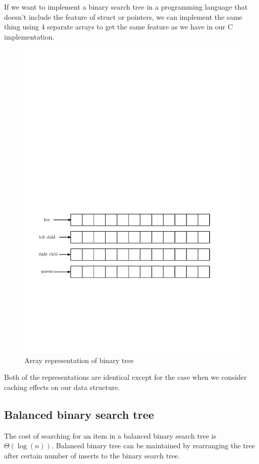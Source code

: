 \documentclass[11pt]{article}
\theoremstyle{definition}
\begin{document}
    If we want to implement a binary search tree in a programming language that doesn't include the feature of struct or pointers, we can implement the same thing using 4 separate arrays to get the same feature as we have in our C implementation.
    \begin{figure}[tbh]
        \centering
        \includegraphics[scale=0.8]{figures/arrayrepresentation.pdf}
        \caption{Array representation of binary tree}
        \label{fig:arrayrepresentation}
    \end{figure}

    Both of the representations are identical except for the case when we consider caching effects on our data structure.

    \subsection*{Balanced binary search tree}
    The cost of searching for an item in a balanced binary search tree is $\Theta(\log{(n)})$. Balanced binary tree can be maintained by rearranging the tree after certain number of inserts to the binary search tree.
    
\end{document}
